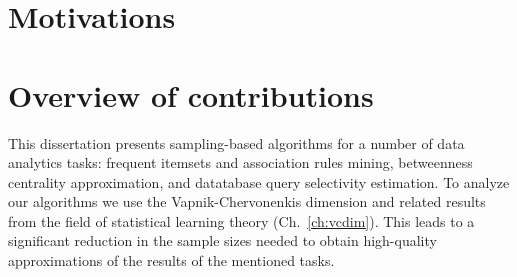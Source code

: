 %
%

\section{Motivations}

\section{Overview of contributions}
This dissertation presents sampling-based algorithms for a number of data
analytics tasks: frequent itemsets and association rules mining, betweenness
centrality approximation, and datatabase query selectivity estimation. To
analyze our algorithms we use the Vapnik-Chervonenkis dimension and related
results from the field of statistical learning theory (Ch.~\ref{ch:vcdim}). This
leads to a significant reduction in the sample sizes needed to obtain
high-quality approximations of the results of the mentioned tasks.

